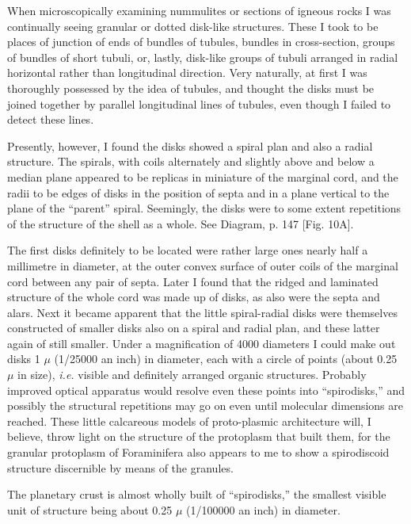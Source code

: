 \documentclass[a4paper, 12pt, oneside]{article}
\begin{document}
When microscopically examining nummulites or sections of igneous rocks I was continually seeing granular or dotted disk-like structures. These I took to be places of junction of ends of bundles of tubules, bundles in cross-section, groups of bundles of short tubuli, or, lastly, disk-like groups of tubuli arranged in radial horizontal rather than longitudinal direction. Very naturally, at first I was thoroughly possessed by the idea of tubules, and thought the disks must be joined together by parallel longitudinal lines of tubules, even though I failed to detect these lines.

Presently, however, I found the disks showed a spiral plan and also a radial structure. The spirals, with coils alternately and slightly above and below a median plane appeared to be replicas in miniature of the marginal cord, and the radii to be edges of disks in the position of septa and in a plane vertical to the plane of the ``parent'' spiral. Seemingly, the disks were to some extent repetitions of the structure of the shell as a whole. See Diagram, p. 147 [Fig. 10A].

The first disks definitely to be located were rather large ones nearly half a millimetre in diameter, at the outer convex surface of outer coils of the marginal cord between any pair of septa. Later I found that the ridged and laminated structure of the whole cord was made up of disks, as also were the septa and alars. Next it became apparent that the little spiral-radial disks were themselves constructed of smaller disks also on a spiral and radial plan, and these latter again of still smaller. Under a magnification of 4000 diameters I could make out disks 1 $\mu$ (1/25000 an inch) in diameter, each with a circle of points (about 0.25 $\mu$ in size), \emph{i.e.} visible and definitely arranged organic structures. Probably improved optical apparatus would resolve even these points into ``spirodisks,'' and possibly the structural repetitions may go on even until molecular dimensions are reached. These little calcareous models of proto-plasmic architecture will, I believe, throw light on the structure of the protoplasm that built them, for the granular protoplasm of Foraminifera also appears to me to show a spirodiscoid structure discernible by means of the granules.

The planetary crust is almost wholly built of ``spirodisks,'' the smallest visible unit of structure being about 0.25 $\mu$ (1/100000 an inch) in diameter.
\end{document}

